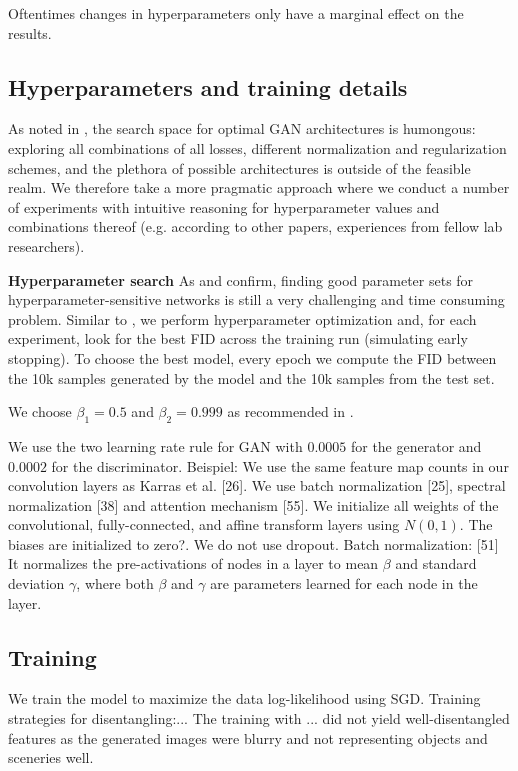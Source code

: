 \documentclass[12pt,a4paper]{article}
\begin{document}
\par Oftentimes changes in hyperparameters only have a marginal effect on the results.

\subsection{Hyperparameters and training details}
As noted in \cite{GANLandscape}, the search space for optimal GAN architectures is humongous: exploring all combinations of all losses, different normalization and regularization schemes, and the plethora of possible architectures is outside of the feasible realm. We therefore take a more pragmatic approach where we conduct a number of experiments with intuitive reasoning for hyperparameter values and combinations thereof (e.g. according to other papers, experiences from fellow lab researchers).

\textbf{Hyperparameter search} As \cite{SpatialBDecoder} and \cite{ChallCmonAssInUnLearOfDR} confirm, finding good parameter sets for hyperparameter-sensitive networks is still a very challenging and time consuming problem. Similar to \cite{AreGANsEqual}, we perform hyperparameter optimization and, for each experiment, look for the best FID across the training run (simulating early stopping). To choose the best model, every epoch we compute the FID between the 10k samples generated by the model and the 10k samples from the test set.

We choose $\beta_1 = 0.5$ and $\beta_2 = 0.999$ as recommended in \cite{GANLandscape}.

We use the two learning rate rule for GAN \cite{1706.08500} with $0.0005$ for the generator and $0.0002$ for the discriminator.
Beispiel: We use the same feature map counts in our convolution layers as Karras et al. [26]. We use batch normalization [25], spectral normalization [38] and attention mechanism [55].
We initialize all weights of the convolutional, fully-connected, and affine transform layers using $N(0, 1)$. The biases are initialized to zero?.
We do not use dropout.
Batch normalization: [51] It normalizes the pre-activations of nodes in a layer to mean $\beta$ and standard deviation $\gamma$, where both $\beta$ and $\gamma$ are parameters learned for each node in the layer.

\subsection{Training}
We train the model to maximize the data log-likelihood using SGD.
Training strategies for disentangling:...
The training with ... did not yield well-disentangled features as the generated images were blurry and not representing objects and sceneries well. 
\end{document}
